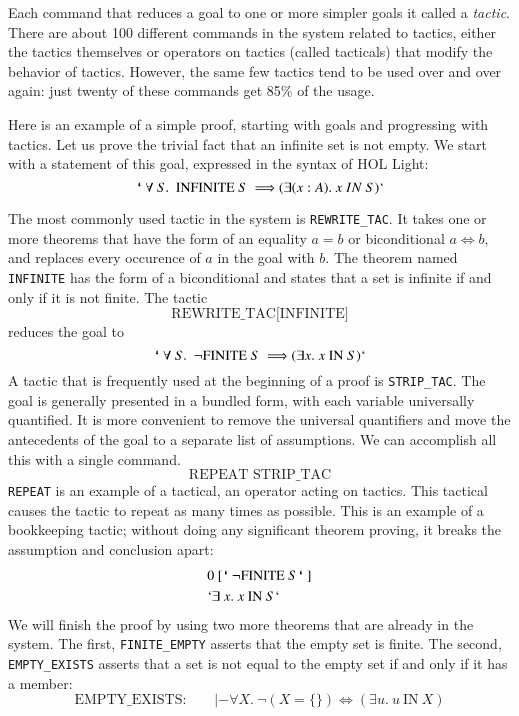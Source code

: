\documentclass{llncs}
\def\bq{\text{\tt {`}\,}}
\begin{document}
Each command that reduces a goal to one or more simpler goals it
called a {\it tactic}.  There are about 100 different commands in the
system related to tactics, either the tactics themselves or operators
on tactics (called tacticals) that modify the behavior of tactics.
However, the same few tactics tend to be used over and over again:
just twenty of these commands get 85\% of the usage.

Here is an example of a simple proof, starting with goals and
progressing with tactics.  Let us prove the trivial fact that an
infinite set is not empty.  We start with a statement of this goal,
expressed in the syntax of HOL Light:
\[
\bq \forall~ S.~~ \text{INFINITE}~ S~ \Longrightarrow (\exists (x:A).~ x~IN~S)`
\]

The most commonly used tactic in the system is {\tt REWRITE\_TAC}.  It
takes one or more theorems that have the form of an equality $a=b$ or
biconditional $a \Leftrightarrow b$, and replaces every occurence of
$a$ in the goal with $b$.  The theorem named {\tt INFINITE} has the
form of a biconditional and states that a set is infinite if and only
if it is not finite.  The tactic
\[
\text{REWRITE\_TAC[INFINITE]}
\]
reduces the goal to
\[
\bq \forall~ S.~~ \lnot\text{FINITE}~ S~ \Longrightarrow (\exists x.~ x~\text{IN}~S)`
\]
A tactic that is frequently used at the beginning of a proof is {\tt STRIP\_TAC}.
The goal is generally presented in a bundled form, with each variable universally
quantified.  It is more convenient to remove the universal quantifiers and
move the antecedents of the goal to a separate list of assumptions.  We can
accomplish all this with a single command.
\[
\text{REPEAT STRIP\_TAC}
\]
{\tt REPEAT} is an example of a tactical, an operator acting on tactics.  This 
tactical causes the tactic to repeat as many times as possible. 
This is an example of a bookkeeping tactic;  without doing any significant theorem
proving, it breaks the assumption and conclusion apart:
\begin{align*}
  &0~[\bq\lnot\text{FINITE}~ S\bq]\\
  &`\exists~ x.~ x~ \text{IN}~ S`\\
\end{align*}
We will finish the proof by using two more theorems that are already in the system.
The first, {\tt FINITE\_EMPTY} asserts that the empty set is finite.  The second,
{\tt EMPTY\_EXISTS} asserts that a set is not equal to the empty set if and only if
it has a member:
\[
\text{EMPTY\_EXISTS:}\qquad |- \forall X.~\lnot(X = \{\}) \Leftrightarrow (\exists u.~u~\text{IN}~X)
\]
\end{document}
